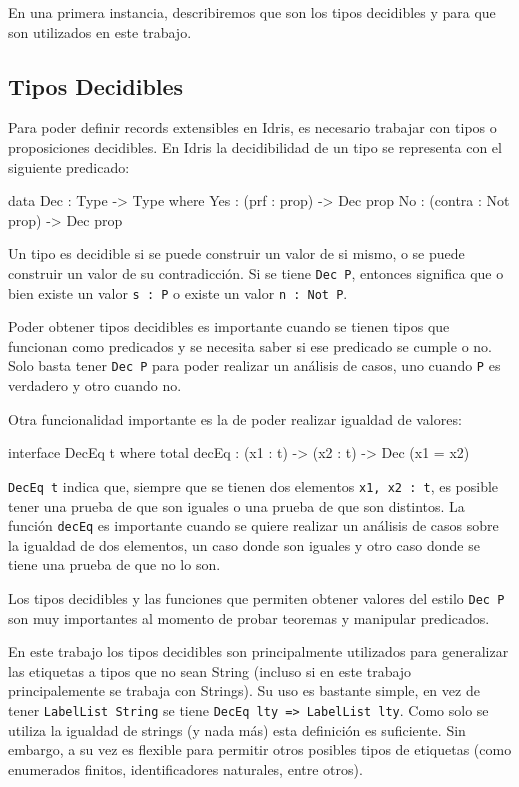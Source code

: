 En una primera instancia, describiremos que son los tipos decidibles y para que son utilizados en este trabajo.

\subsection{Tipos Decidibles}

Para poder definir records extensibles en Idris, es necesario trabajar con tipos o proposiciones decidibles. En Idris la decidibilidad de un tipo se representa con el siguiente predicado:

\begin{code}
data Dec : Type -> Type where
  Yes : (prf : prop) -> Dec prop
  No  : (contra : Not prop) -> Dec prop
\end{code}

Un tipo es decidible si se puede construir un valor de si mismo, o se puede construir un valor de su contradicción. Si se tiene \texttt{Dec P}, entonces significa que o bien existe un valor \texttt{s : P} o existe un valor \texttt{n : Not P}.

Poder obtener tipos decidibles es importante cuando se tienen tipos que funcionan como predicados y se necesita saber si ese predicado se cumple o no. Solo basta tener \texttt{Dec P} para poder realizar un análisis de casos, uno cuando \texttt{P} es verdadero y otro cuando no.

Otra funcionalidad importante es la de poder realizar igualdad de valores:

\begin{code}
interface DecEq t where
  total decEq : (x1 : t) -> (x2 : t) -> Dec (x1 = x2)
\end{code}

\texttt{DecEq t} indica que, siempre que se tienen dos elementos \texttt{x1, x2 : t}, es posible tener una prueba de que son iguales o una prueba de que son distintos. La función \texttt{decEq} es importante cuando se quiere realizar un análisis de casos sobre la igualdad de dos elementos, un caso donde son iguales y otro caso donde se tiene una prueba de que no lo son.

Los tipos decidibles y las funciones que permiten obtener valores del estilo \texttt{Dec P} son muy importantes al momento de probar teoremas y manipular predicados.

En este trabajo los tipos decidibles son principalmente utilizados para generalizar las etiquetas a tipos que no sean String (incluso si en este trabajo principalemente se trabaja con Strings). Su uso es bastante simple, en vez de tener \texttt{LabelList String} se tiene \texttt{DecEq lty => LabelList lty}. Como solo se utiliza la igualdad de strings (y nada más) esta definición es suficiente. Sin embargo, a su vez es flexible para permitir otros posibles tipos de etiquetas (como enumerados finitos, identificadores naturales, entre otros).

